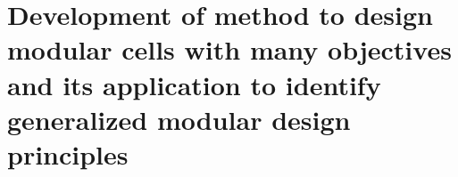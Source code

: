 \chapter{Development of method to design modular cells with many objectives and its application to identify generalized modular design principles} \label{ch:hpc}
